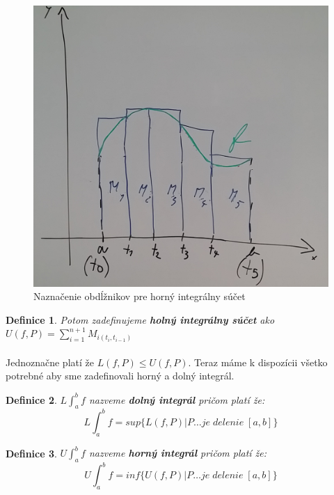 \documentclass[12pt,a4paper]{article}
\newtheorem{definition}{Definice}
\begin{document}
\begin{figure}[H]
	\begin{center}
		\includegraphics[scale=0.2]{img/int3}
	\end{center}
	\caption{Naznačenie obdĺžnikov pre horný integrálny súčet\label{int3}}
\end{figure}

\begin{definition}
	Potom zadefinujeme \textbf{holný integrálny súčet} ako $U(f, P)=\sum_{i=1}^{n+1}M_{i(t_{i}, t_{i-1})}$
\end{definition}

\paragraph{}
Jednoznačne platí že $L(f, P)\leq U(f, P)$. Teraz máme k dispozícii všetko potrebné aby sme zadefinovali horný a dolný integrál.

\begin{definition}
	$L\int_{a}^{b}f$ nazveme \textbf{dolný integrál} pričom platí že: $$L\int_{a}^{b}f= sup\{ L(f, P)|P\dots je \;delenie \;[a, b]\}$$
\end{definition}

\begin{definition}
	$U\int_{a}^{b}f$ nazveme \textbf{horný integrál} pričom platí že: $$U\int_{a}^{b}f= inf\{ U(f, P)|P\dots je \;delenie \;[a, b]\}$$
\end{definition}
\end{document}
